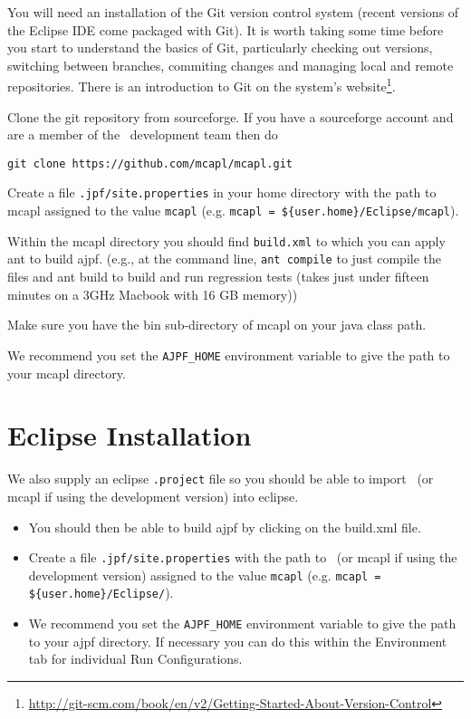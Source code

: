 You will need an installation of the Git version control system (recent versions of the Eclipse IDE come packaged with Git).  It is worth taking some time before you start to understand the basics of Git, particularly checking out versions, switching between branches, commiting changes and managing local and remote repositories.  There is an introduction to Git on the system's website\footnote{\url{http://git-scm.com/book/en/v2/Getting-Started-About-Version-Control}}.

\begin{itemize}
\begin{sloppypar}
\item Clone the git repository from sourceforge.  If you have a sourceforge account and are a member of the \ajpf\ development team then do
\begin{small}
\begin{verbatim}
git clone https://github.com/mcapl/mcapl.git
\end{verbatim}
\end{small}
\end{sloppypar}
\item Create a file \texttt{.jpf/site.properties} in your home directory with the path to mcapl assigned to the value \texttt{mcapl} (e.g. \texttt{mcapl = \$\{user.home\}/Eclipse/mcapl}).
\item Within the mcapl directory you should find \texttt{build.xml} to which you can apply ant to build ajpf. (e.g., at the command line, \lstinline{ant compile} to just compile the files and ant build to build and run regression tests (takes just under fifteen minutes on a 3GHz Macbook with 16 GB memory))
\item Make sure you have the bin sub-directory of mcapl on your java class path.
\item We recommend you set the \texttt{AJPF\_HOME} environment variable to give the path to your mcapl directory.
\end{itemize}

\section{Eclipse Installation}

We also supply an eclipse \texttt{.project} file so you should be able to import \ajpfversion\ (or mcapl if using the development version)  into eclipse.
\begin{itemize}
\item You should then be able to build ajpf by clicking on the build.xml file.
\item Create a file \texttt{.jpf/site.properties} with the path to \ajpfversion\ (or mcapl if using the development version)  assigned to the value \texttt{mcapl} (e.g. \texttt{mcapl = \$\{user.home\}/Eclipse/\ajpfversion}).
\item We recommend you set the \texttt{AJPF\_HOME} environment variable to give the path to your ajpf directory.  If necessary you can do this within the Environment tab for individual Run Configurations.
\end{itemize}

